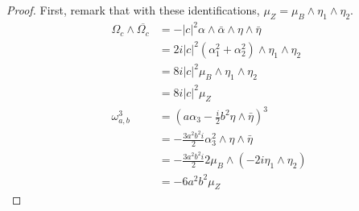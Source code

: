 \documentclass[10pt,a4paper]{amsart}
\begin{document}
\begin{proof}
First, remark that with these identifications, $\mu_Z=\mu_B\wedge\eta_1\wedge\eta_2$. 
    \begin{align*}
        \Omega_c\wedge\overline{\Omega_c}&=-|c|^2\alpha\wedge\bar\alpha\wedge\eta\wedge\bar\eta\\
        &=2i|c|^2(\alpha_1^2+\alpha_2^2)\wedge\eta_1\wedge\eta_2\\
        &=8i|c|^2\mu_B\wedge\eta_1\wedge\eta_2\\
        &=8i|c|^2\mu_Z\\
        \omega_{a,b}^3&=(a\alpha_3-\frac{i}{2}b^2\eta\wedge\bar\eta)^3\\
        &=-\frac{3a^2b^2i}{2}\alpha_3^2\wedge\eta\wedge\bar\eta\\
        &=-\frac{3a^2b^2i}{2}2\mu_B\wedge(-2i\eta_1\wedge\eta_2)\\
        &=-6a^2b^2\mu_Z
    \end{align*}
\end{proof}
\end{document}
